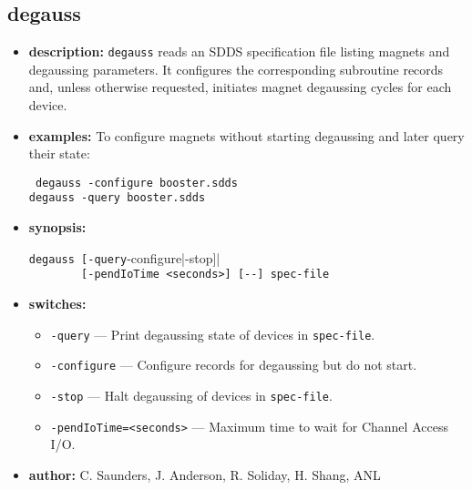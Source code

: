 \begin{latexonly}
\newpage
\end{latexonly}
\subsection{degauss}
\label{degauss}

\begin{itemize}
\item {\bf description:}
\verb+degauss+ reads an SDDS specification file listing magnets and degaussing parameters.
It configures the corresponding subroutine records and, unless otherwise requested, initiates
magnet degaussing cycles for each device.
\item {\bf examples:}
To configure magnets without starting degaussing and later query their state:
\begin{flushleft}{\tt
  degauss -configure booster.sdds\\
  degauss -query booster.sdds
}\end{flushleft}
\item {\bf synopsis:}
\begin{flushleft}
\verb|degauss [-query|-configure|-stop]|\\
\verb|        [-pendIoTime <seconds>] [--] spec-file|
\end{flushleft}
\item {\bf switches:}
  \begin{itemize}
    \item {\tt -query} --- Print degaussing state of devices in {\tt spec-file}.
    \item {\tt -configure} --- Configure records for degaussing but do not start.
    \item {\tt -stop} --- Halt degaussing of devices in {\tt spec-file}.
    \item {\tt -pendIoTime=<seconds>} --- Maximum time to wait for Channel Access I/O.
  \end{itemize}
\item {\bf author:} C. Saunders, J. Anderson, R. Soliday, H. Shang, ANL
\end{itemize}
